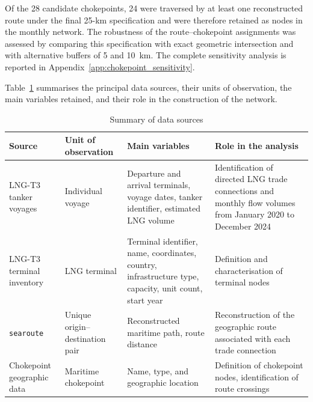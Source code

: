 \documentclass[pdftex,12pt,openright,a4paper,oneside]{book}
\begin{document}
Of the 28 candidate chokepoints, 24 were traversed by at least one
reconstructed route under the final 25-km specification and were
therefore retained as nodes in the monthly network. The robustness
of the route--chokepoint assignments was assessed by comparing this
specification with exact geometric intersection and with alternative
buffers of 5 and 10~km. The complete sensitivity analysis is
reported in Appendix~\ref{app:chokepoint_sensitivity}.

Table~\ref{tab:data_sources} summarises the principal data sources, their units of observation, the main variables retained, and their role in the construction of the network.

\begin{table}[H] 
    \centering 
    \caption{Summary of data sources} 
    \label{tab:data_sources} 
    \small 
    \begin{tabularx}{\textwidth}{ 
        >{\raggedright\arraybackslash}p{} 
        >{\raggedright\arraybackslash}p{} 
        >{\raggedright\arraybackslash}X 
        >{\raggedright\arraybackslash}X 
    } 
        \toprule 
        \textbf{Source} & 
        \textbf{Unit of observation} & 
        \textbf{Main variables} & 
        \textbf{Role in the analysis} \\ 
        \midrule 
        
        LNG-T3 tanker voyages & 
        Individual voyage & 
        Departure and arrival terminals, voyage dates, tanker identifier, estimated LNG volume & 
        Identification of directed LNG trade connections and monthly flow volumes from January 2020 to December 2024\\ 
        \addlinespace 
        
        LNG-T3 terminal inventory & 
        LNG terminal & 
        Terminal identifier, name, coordinates, country, infrastructure type, capacity, unit count, start year & 
        Definition and characterisation of terminal nodes \\ 
        \addlinespace 
        
        \texttt{searoute} & 
        Unique origin--destination pair & 
        Reconstructed maritime path, route distance & 
        Reconstruction of the geographic route associated with each trade connection \\ 
        \addlinespace 
        
        Chokepoint geographic data & 
        Maritime chokepoint & 
        Name, type, and geographic location & 
        Definition of chokepoint nodes, identification of route crossings \\ 
        \bottomrule 
    \end{tabularx} 
\end{table}
\end{document}
